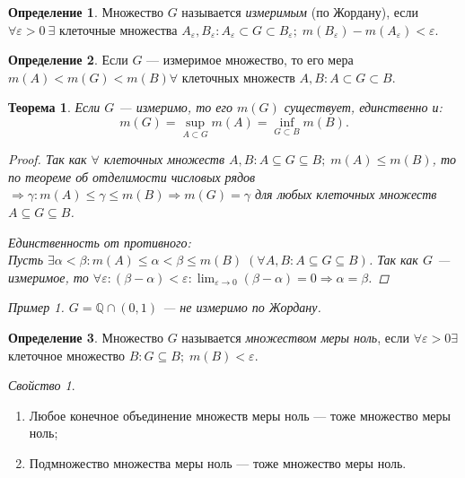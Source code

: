 \documentclass[a4paper,12pt]{article}
\newtheorem*{theorem}{Теорема}
\theoremstyle{remark}
\newtheorem*{example}{Пример}
\newtheorem*{property}{Свойство}
\theoremstyle{definition}
\newtheorem{definition}{Определение}
\begin{document}
\begin{definition}
    Множество \(G\) называется \emph{измеримым} (по Жордану), если \(\forall \varepsilon > 0\:\exists \) клеточные множества \(A_\varepsilon, B_\varepsilon: A_\varepsilon \subset G \subset B_\varepsilon;\; m(B_\varepsilon) - m(A_\varepsilon) < \varepsilon\).
\end{definition}

\begin{definition}
    Если \(G\) --- измеримое множество, то его мера \(m(A) < m(G) < m(B) \forall\) клеточных множеств \(A, B: A \subset G \subset B\).
\end{definition}

\begin{theorem}
    Если \(G\) --- измеримо, то его \(m(G)\) существует, единственно и:
    \begin{equation*}
        m(G) = \sup_{A \subset G} m(A) = \inf_{G \subset B} m(B).
    \end{equation*}

    \begin{proof}
        Так как \(\forall\) клеточных множеств \(A, B: A \subseteq G \subseteq B;\; m(A) \leqslant m(B)\), то по теореме об отделимости числовых рядов \(\Rightarrow \gamma : m(A) \leqslant \gamma \leqslant m(B) \Rightarrow m(G) = \gamma\) для любых клеточных множеств \(A \subseteq G \subseteq B\).

        \emph{Единственность} от противного: \\
        Пусть \(\exists \alpha < \beta: m(A) \leqslant \alpha < \beta \leqslant m(B)\;(\forall A,B: A \subseteq G \subseteq B)\).
        Так как \(G\) --- измеримое, то \(\forall \varepsilon:(\beta - \alpha) < \varepsilon: \lim_{\varepsilon \rightarrow 0} (\beta - \alpha) = 0 \Rightarrow \alpha = \beta\).
    \end{proof}

    \begin{example}
        \(G = \mathbb{Q} \cap (0, 1)\) --- не измеримо по Жордану.
    \end{example}
\end{theorem}

\begin{definition}
    Множество \(G\) называется \emph{множеством меры ноль}, если \(\forall \varepsilon > 0 \exists\) клеточное множество \(B: G \subseteq B;\; m(B) < \varepsilon\).
\end{definition}

\begin{property} \(\)
    \begin{enumerate}
        \item Любое конечное объединение множеств меры ноль --- тоже множество меры ноль;
        \item Подмножество множества меры ноль --- тоже множество меры ноль.
    \end{enumerate}
\end{property}
\end{document}
